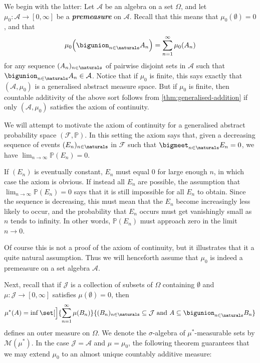 \documentclass[article, a4paper, 11pt, oneside]{memoir}
\numberwithin{equation}{chapter}
\newcommand{\calF}{\mathcal{F}}
\newcommand{\calA}{\mathcal{A}}
\newcommand{\calJ}{\mathcal{J}}
\newcommand{\calM}{\mathcal{M}}
\renewcommand{\P}{\mathbb{P}}
\newcommand{\keyword}[1]{{\itshape\bfseries #1}}
\begin{document}
We begin with the latter: Let $\calA$ be an algebra on a set $\Omega$, and let $\mu_0 \colon \calA \to [0,\infty]$ be a \keyword{premeasure} on $\calA$. Recall that this means that $\mu_0(\emptyset) = 0$, and that
%
\begin{equation*}
    \mu_0 \Bigl( \bigunion_{n\in\naturals} A_n \Bigr)
        = \sum_{n=1}^\infty \mu_0(A_n)
\end{equation*}
%
for any sequence $(A_n)_{n\in\naturals}$ of pairwise disjoint sets in $\calA$ such that $\bigunion_{n\in\naturals} A_n \in \calA$. Notice that if $\mu_0$ is finite, this says exactly that $(\calA,\mu_0)$ is a generalised abstract measure space. But if $\mu_0$ is finite, then countable additivity of the above sort follows from \cref{thm:generalised-addition} if only $(\calA,\mu_0)$ satisfies the axiom of continuity.

We will attempt to motivate the axiom of continuity for a generalised abstract probability space $(\calF, \P)$. In this setting the axiom says that, given a decreasing sequence of events $(E_n)_{n\in\naturals}$ in $\calF$ such that $\bigmeet_{n\in\naturals} E_n = 0$, we have $\lim_{n\to\infty} \P(E_n) = 0$.

If $(E_n)$ is eventually constant, $E_n$ must equal $0$ for large enough $n$, in which case the axiom is obvious. If instead all $E_n$ are possible, the assumption that $\lim_{n\to\infty} \P(E_n) = 0$ says that it is still impossible for all $E_n$ to obtain. Since the sequence is decreasing, this must mean that the $E_n$ become increasingly less likely to occur, and the probability that $E_n$ occurs must get vanishingly small as $n$ tends to infinity. In other words, $\P(E_n)$ must approach zero in the limit $n \to 0$.

Of course this is not a proof of the axiom of continuity, but it illustrates that it a quite natural assumption. Thus we will henceforth assume that $\mu_0$ is indeed a premeasure on a set algebra $\calA$.

Next, recall that if $\calJ$ is a collection of subsets of $\Omega$ containing $\emptyset$ and $\mu \colon \calJ \to [0,\infty]$ satisfies $\mu(\emptyset) = 0$, then
%
\begin{equation}
    \label{eq:outer-measure}
    \mu^*(A)
        = \inf \set[\Big]{
            \sum_{n=1}^\infty \mu(B_n)
        }{
            (B_n)_{n \in \naturals} \subseteq \calJ
            \text{ and }
            A \subseteq \bigunion_{n \in \naturals} B_n
        }
\end{equation}
%
defines an outer measure on $\Omega$. We denote the $\sigma$-algebra of $\mu^*$-measurable sets by $\calM(\mu^*)$. In the case $\calJ = \calA$ and $\mu = \mu_0$, the following theorem guarantees that we may extend $\mu_0$ to an almost unique countably additive measure:
\end{document}
